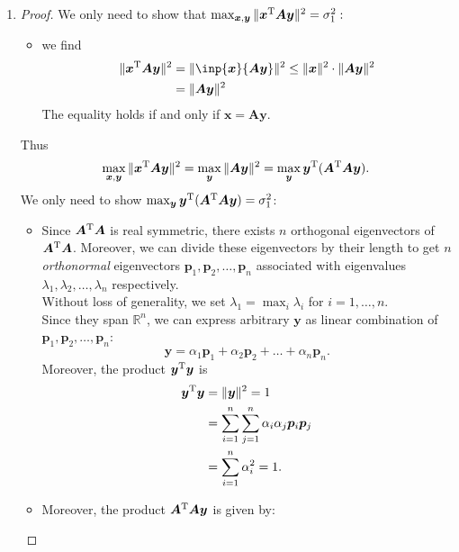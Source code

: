 \begin{enumerate}
\begin{proof}
\begin{enumerate}
\begin{itemize}
\begin{align*}
\sum_{i=k+1}^{n}\sigma_i\bm v_i\bm u_i\trans\times\sum_{i=k+1}^{n}\sigma_i\bm u_i\bm v_i\trans
\right)
\end{align*}
Similarly, we obtain
\[
\|\bm A-\bm A_k\|_{\bm F}^{2}=\sum_{i=k+1}^{n}\sigma_i^2.
\]
\item
Otherwise, $\bm A_k=\bm A$, thus $\|\bm A-\bm A_k\|_{\bm F}^{2}=0.$
\end{itemize}
\end{enumerate}
\end{proof}
\item
\begin{proof}
We only need to show that $\max_{\bm x,\bm y}\|\bm x^{\mathrm T}\bm A\bm y\|^2=\sigma_1^2:$
\begin{itemize}
\item
we find
\begin{align*}
\|\bm x\trans\bm A\bm y\|^2&=\|\inp{\bm x}{\bm{Ay}}\|^2\le\|\bm x\|^2\cdot\|\bm{Ay}\|^2\\
&=\|\bm{Ay}\|^2
\end{align*}
The equality holds if and only if $\bm x=\bm{Ay}$.
\end{itemize}
Thus
\[
\max_{\bm x,\bm y}\|\bm x^{\mathrm T}\bm A\bm y\|^2=\max_{\bm y}\|\bm{Ay}\|^2=\max_{\bm y}\bm y^{\mathrm T}(\bm A^{\mathrm T}\bm A\bm y).
\]
We only need to show $\max_{\bm y}\bm y^{\mathrm T}(\bm A^{\mathrm T}\bm A\bm y)=\sigma_1^2$:
\begin{itemize}
\item
Since $\bm A^{\mathrm T}\bm A$ is real symmetric, there exists $n$ orthogonal eigenvectors of $\bm A^{\mathrm T}\bm A$. Moreover, we can divide these eigenvectors by their length to get $n$ \emph{orthonormal} eigenvectors $\bm p_1,\bm p_2,\dots,\bm p_n$ associated with eigenvalues $\lambda_1,\lambda_2,\dots,\lambda_n$ respectively.\\
Without loss of generality, we set $\lambda_1=\max_{i}\lambda_i$ for $i=1,\dots,n.$\\
Since they span $\mathbb{R}^{n}$, we can express arbitrary $\bm y$ as linear combination of $\bm p_1,\bm p_2,\dots,\bm p_n$:
\[
\bm y=\alpha_1\bm p_1+\alpha_2\bm p_2+\dots+\alpha_n\bm p_n.
\]
Moreover, the product $\bm y^{\mathrm T}\bm y$ is
\begin{align*}
\bm y^{\mathrm T}\bm y&=\|\bm y\|^2=1\\
&=\sum_{i=1}^{n}\sum_{j=1}^{n}\alpha_i\alpha_j\bm p_i\bm p_j\\
&=\sum_{i=1}^{n}\alpha_i^2=1.
\end{align*}
\item
Moreover, the product $\bm A^{\mathrm T}\bm A\bm y$ is given by:

\end{itemize}
\end{proof}
\end{enumerate}
